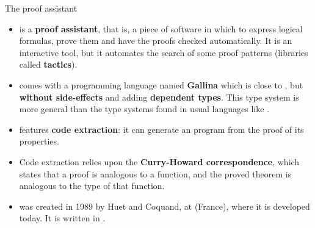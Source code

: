 \documentclass[compress,dvipdfmx]{beamer}
\begin{document}
\begin{frame}{The proof assistant \Coq}

  \begin{itemize}

    \item \Coq is a \textbf{proof assistant}, that is, a piece of
      software in which to express logical formulas, prove them and
      have the proofs checked automatically. It is an interactive
      tool, but it automates the search of some proof patterns
      (libraries called \textbf{tactics}).

    \item \Coq comes with a programming language named
      \textbf{Gallina} which is close to \OCaml, but \textbf{without
        side\hyp{}effects} and adding \textbf{dependent types}. This
      type system is more general than the type systems found in usual
      languages like \Java.

    \item \Coq features \textbf{code extraction}: it can generate an
      \OCaml program from the proof of its properties.


    \item Code extraction relies upon the \textbf{Curry\hyp{}Howard
      correspondence}, which states that a proof is analogous to a
      function, and the proved theorem is analogous to the type of
      that function.

    \item \Coq was created in 1989 by Huet and Coquand, at \Inria
      (France), where it is developed today. It is written in \OCaml.

  \end{itemize}

\end{frame}
\end{document}
